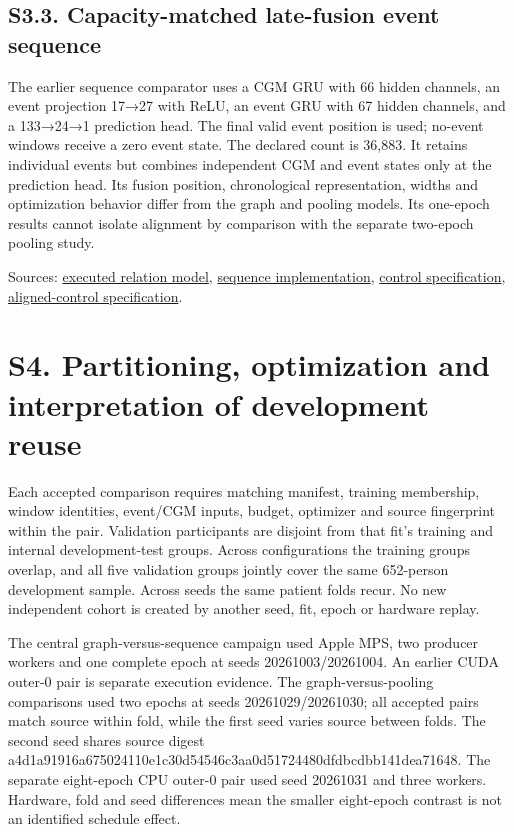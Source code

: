 \documentclass[11pt,a4paper]{article}
\begin{document}
\subsection*{S3.3. Capacity-matched late-fusion event sequence}
The earlier sequence comparator uses a CGM GRU with 66 hidden channels, an event projection 17→27 with ReLU, an event GRU with 67 hidden channels, and a 133→24→1 prediction head. The final valid event position is used; no-event windows receive a zero event state. The declared count is 36,883. It retains individual events but combines independent CGM and event states only at the prediction head. Its fusion position, chronological representation, widths and optimization behavior differ from the graph and pooling models. Its one-epoch results cannot isolate alignment by comparison with the separate two-epoch pooling study.

Sources: \href{../kaggle_event_sequence_gru/train_history_relations.py}{executed relation model}, \href{../kaggle_event_sequence_gru/train_history_controlled.py}{sequence implementation}, \href{../docs/loop_non_graph_capacity_matched_control.md}{control specification}, \href{../docs/loop_time_aligned_nongraph_control.md}{aligned-control specification}.

\section*{S4. Partitioning, optimization and interpretation of development reuse}
Each accepted comparison requires matching manifest, training membership, window identities, event/CGM inputs, budget, optimizer and source fingerprint within the pair. Validation participants are disjoint from that fit's training and internal development-test groups. Across configurations the training groups overlap, and all five validation groups jointly cover the same 652-person development sample. Across seeds the same patient folds recur. No new independent cohort is created by another seed, fit, epoch or hardware replay.

The central graph-versus-sequence campaign used Apple MPS, two producer workers and one complete epoch at seeds 20261003/20261004. An earlier CUDA outer-0 pair is separate execution evidence. The graph-versus-pooling comparisons used two epochs at seeds 20261029/20261030; all accepted pairs match source within fold, while the first seed varies source between folds. The second seed shares source digest a4d1a919\allowbreak{}16a67502\allowbreak{}4110e1c3\allowbreak{}0d54546c\allowbreak{}3aa0d517\allowbreak{}24480dfd\allowbreak{}bcdbb141\allowbreak{}dea71648. The separate eight-epoch CPU outer-0 pair used seed 20261031 and three workers. Hardware, fold and seed differences mean the smaller eight-epoch contrast is not an identified schedule effect.
\end{document}

